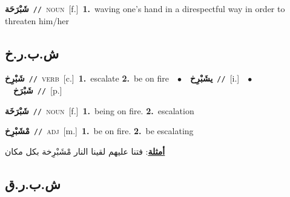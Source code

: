 \documentclass[10pt,a4paper,twoside]{article} %
\begin{document}
\begin{multicols}{2}
{{{{{{\setlength\topsep{0pt}\textbf{\foreignlanguage{arabic}{شَبْرَحَة}}\ {\color{gray}\texttt{//}\color{black}}\ \textsc{noun}\ [f.]\ \textbf{1.}~waving one's hand in a direspectful way in order to threaten him/her\ 

\vspace{-3mm}
\subsection*{\color{blue}\foreignlanguage{arabic}{ش.ب.ر.خ}\color{blue}{}} 

{\setlength\topsep{0pt}\textbf{\foreignlanguage{arabic}{شَبْرِخ}}\ {\color{gray}\texttt{//}\color{black}}\ \textsc{verb}\ [c.]\ \textbf{1.}~escalate  \textbf{2.}~be on fire\ \ $\bullet$\ \ \setlength\topsep{0pt}\textbf{\foreignlanguage{arabic}{يشَبْرِخ}}\ {\color{gray}\texttt{//}\color{black}}\ [i.]\ \ $\bullet$\ \ \setlength\topsep{0pt}\textbf{\foreignlanguage{arabic}{شَبْرَخ}}\ {\color{gray}\texttt{//}\color{black}}\ [p.]\ 

{\setlength\topsep{0pt}\textbf{\foreignlanguage{arabic}{شَبْرَخَة}}\ {\color{gray}\texttt{//}\color{black}}\ \textsc{noun}\ [f.]\ \textbf{1.}~being on fire.  \textbf{2.}~escalation\ 

{\setlength\topsep{0pt}\textbf{\foreignlanguage{arabic}{مْشَبْرِخ}}\ {\color{gray}\texttt{//}\color{black}}\ \textsc{adj}\ [m.]\ \textbf{1.}~be on fire.  \textbf{2.}~be escalating\  \begin{flushright}\color{gray}\foreignlanguage{arabic}{\textbf{\underline{\foreignlanguage{arabic}{أمثلة}}}: فتنا عليهم لقينا النار مْشَبْرِخة بكل مكان}\end{flushright}\color{black}} \vspace{2mm}

\vspace{-3mm}
\subsection*{\color{blue}\foreignlanguage{arabic}{ش.ب.ر.ق}\color{blue}{}} 

}}}}}}}}
\end{multicols}
\end{document}
